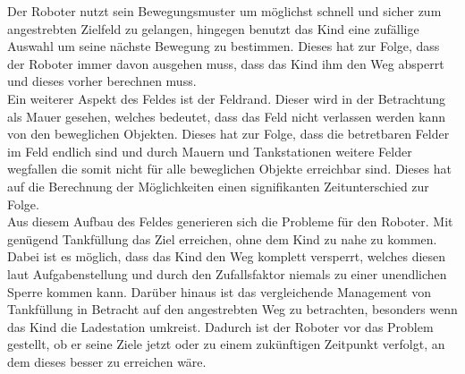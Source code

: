 Der Roboter nutzt sein Bewegungsmuster um möglichst schnell und sicher zum angestrebten Zielfeld zu gelangen, hingegen benutzt das Kind eine zufällige Auswahl um seine nächste Bewegung zu bestimmen. Dieses hat zur Folge, dass der Roboter immer davon ausgehen muss, dass das Kind ihm den Weg absperrt und dieses vorher berechnen muss. \\
Ein weiterer Aspekt des Feldes ist der Feldrand. Dieser wird in der Betrachtung als Mauer gesehen, welches bedeutet, dass das Feld nicht verlassen werden kann von den beweglichen Objekten. Dieses hat zur Folge, dass die betretbaren Felder im Feld endlich sind und durch Mauern und Tankstationen weitere Felder wegfallen die somit nicht für alle beweglichen Objekte erreichbar sind. Dieses hat auf die Berechnung der Möglichkeiten einen signifikanten Zeitunterschied zur Folge. \\
Aus diesem Aufbau des Feldes generieren sich die Probleme für den Roboter. Mit genügend Tankfüllung das Ziel erreichen, ohne dem Kind zu nahe zu kommen. Dabei ist es möglich, dass das Kind den Weg komplett versperrt, welches diesen laut Aufgabenstellung und durch den Zufallsfaktor niemals zu einer unendlichen Sperre kommen kann. Darüber hinaus ist das vergleichende Management von Tankfüllung in Betracht auf den angestrebten Weg zu betrachten, besonders wenn das Kind die Ladestation umkreist. Dadurch ist der Roboter vor das Problem gestellt, ob er seine Ziele jetzt oder zu einem zukünftigen Zeitpunkt verfolgt, an dem dieses besser zu erreichen wäre.

